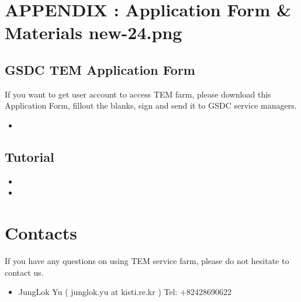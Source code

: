 \documentclass[a4paper,11pt,english]{sphinxmanual}
\begin{document}
\sphinxstepscope


\chapter[APPENDIX : Application Form \& Materials]{APPENDIX : Application Form \& Materials \lowercase{\sphinxincludegraphics}{{new-24}.png}}
\label{\detokenize{app:appendix-application-form-materials-newi}}\label{\detokenize{app::doc}}

\section{GSDC TEM Application Form}
\label{\detokenize{app:gsdc-tem-application-form}}
\sphinxAtStartPar
If you want to get user account to access TEM farm, please download this Application Form, fill\sphinxhyphen{}out the blanks, sign and send it to GSDC service managers.
\begin{itemize}
\item {} 
\sphinxAtStartPar
{}

\end{itemize}


\section{Tutorial}
\label{\detokenize{app:tutorial}}\begin{itemize}
\item {} 
\sphinxAtStartPar
{}

\item {} 
\sphinxAtStartPar
{}

\end{itemize}

\sphinxstepscope


\chapter{Contacts}
\label{\detokenize{contact:contacts}}\label{\detokenize{contact::doc}}
\sphinxAtStartPar
If you have any questions on using TEM service farm, please do not hesitate to contact us.
\begin{itemize}
\item {} 
\sphinxAtStartPar
Jung\sphinxhyphen{}Lok Yu ( junglok.yu at kisti.re.kr ) Tel: +82\sphinxhyphen{}42\sphinxhyphen{}869\sphinxhyphen{}0622

\end{itemize}
\end{document}
